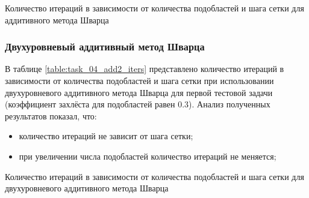 \documentclass[a4paper]{article}
\begin{document}
\begin{table}[h]
\caption{Количество итераций в зависимости от количества подобластей и шага сетки для аддитивного метода Шварца}
\label{table:task_04_add_iters}
\end{table}

\newpage

\subsubsection{Двухуровневый аддитивный метод Шварца}

В таблице \ref{table:task_04_add2_iters} представлено количество итераций в зависимости от количества подобластей и шага сетки при использовании двухуровневого аддитивного метода Шварца для первой тестовой задачи (коэффициент захлёста для подобластей равен 0.3). Анализ полученных результатов показал, что:
\begin{itemize}
\item количество итераций не зависит от шага сетки;
\item при увеличении числа подобластей количество итераций не меняется;
\end{itemize}

\begin{table}[h]
\caption{Количество итераций в зависимости от количества подобластей и шага сетки для двухуровневого аддитивного метода Шварца}
\label{table:task_04_add2_iters}
\end{table}
\end{document}
